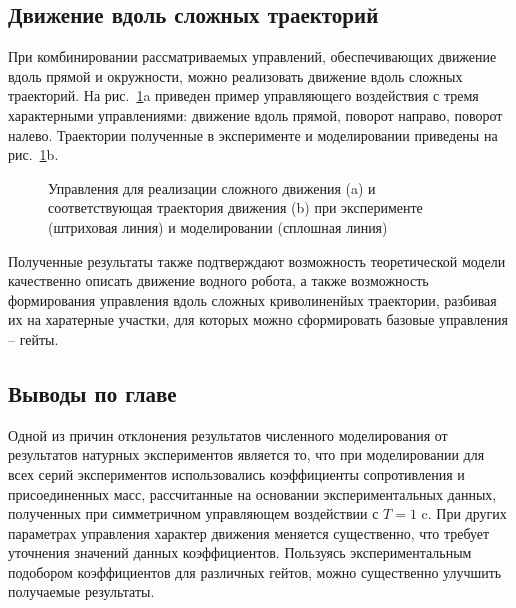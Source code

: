 \subsection{Движение вдоль сложных траекторий}

При комбинировании рассматриваемых управлений, обеспечивающих движение вдоль прямой и окружности, можно реализовать движение вдоль сложных траекторий. На рис.~\ref{Slalom}a приведен пример управляющего воздействия с тремя характерными управлениями: движение вдоль прямой, поворот направо, поворот налево.   Траектории полученные в эксперименте и моделировании приведены на рис.~\ref{Slalom}b.

\begin{figure}[!ht]
	\begin{minipage}[h]{0.5\linewidth}
	\end{minipage}
	\hfill
	\begin{minipage}[h]{0.5\linewidth}
	\end{minipage}
	\caption{Управления для реализации сложного движения (a) и соответствующая траектория движения (b)  при эксперименте (штриховая линия) и моделировании (сплошная линия)}
	\label{Slalom}
\end{figure}


Полученные результаты также подтверждают возможность теоретической модели качественно описать движение водного робота, а также возможность формирования управления вдоль сложных криволиненйых траектории, разбивая их на харатерные участки, для которых можно сформировать базовые управления -- гейты. 

\subsection{Выводы по главе}

Одной из причин отклонения результатов численного моделирования от результатов натурных экспериментов является то, что при моделировании для всех серий экспериментов использовались коэффициенты сопротивления и присоединенных масс, рассчитанные на основании экспериментальных  данных, полученных при симметричном управляющем воздействии с $T = 1$ c. При других параметрах управления характер движения меняется существенно, что требует уточнения значений данных коэффициентов. Пользуясь экспериментальным подобором коэффициентов для различных гейтов, можно существенно улучшить получаемые результаты.

